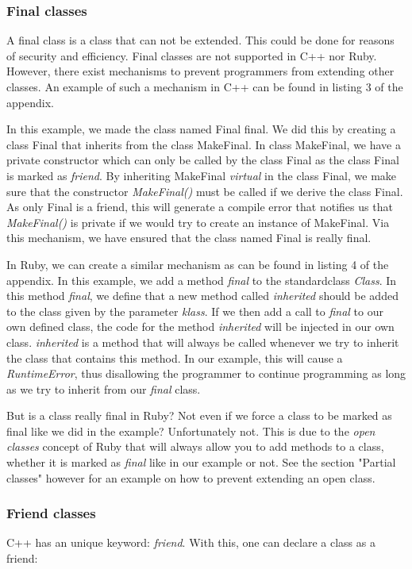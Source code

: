 \documentclass[10pt,a4paper,twocolumn]{article}
\begin{document}
\subsubsection{Final classes}
A final class is a class that can not be extended. This could be done for reasons of security and efficiency. Final classes are not supported in C++ nor Ruby. However, there exist mechanisms to prevent programmers from extending other classes. An example of such a mechanism in C++ can be found in listing 3 of the appendix.

In this example, we made the class named Final final. We did this by creating a class Final that inherits from the class MakeFinal. In class MakeFinal, we have a private constructor which can only be called by the class Final as the class Final is marked as \textit{friend}. By inheriting MakeFinal \textit{virtual} in the class Final, we make sure that the constructor \textit{MakeFinal()} must be called if we derive the class Final. As only Final is a friend, this will generate a compile error that notifies us that \textit{MakeFinal()} is private if we would try to create an instance of MakeFinal. Via this mechanism, we have ensured that the class named Final is really final. 

In Ruby, we can create a similar mechanism as can be found in listing 4 of the appendix. In this example, we add a method \textit{final} to the standardclass \textit{Class}. In this method \textit{final}, we define that a new method called \textit{inherited} should be added to the class given by the parameter \textit{klass}. If we then add a call to \textit{final} to our own defined class, the code for the method \textit{inherited} will be injected in our own class. \textit{inherited} is a method that will always be called whenever we try to inherit the class that contains this method. In our example, this will cause a \textit{RuntimeError}, thus disallowing the programmer to continue programming as long as we try to inherit from our \textit{final} class.

But is a class really final in Ruby? Not even if we force a class to be marked as final like we did in the example? Unfortunately not. This is due to the \textit{open classes} concept of Ruby that will always allow you to add methods to a class, whether it is marked as \textit{final} like in our example or not. See the section "Partial classes" however for an example on how to prevent extending an open class.

\subsubsection{Friend classes}
C++ has an unique keyword: \textit{friend}. With this, one can declare a class as a friend:
\end{document}
